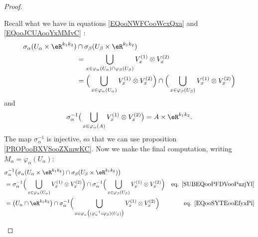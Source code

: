 \begin{proof}
\begin{subproof}
		Recall what we have in equations \eqref{EQooNWFCooWcxQxa} and \eqref{EQooJCUAooYxMMvC} :
		\begin{subequations}
			\begin{align}
				\sigma_{\alpha}(U_{\alpha}\times \eR^{k_1k_2}) & \cap \sigma_{\beta}(U_{\beta}\times \eR^{k_1k_2})                                                                                                                                                  \\
				                                               & =\bigcup_{x\in \varphi_{\alpha}(U_{\alpha})\cap \varphi_{\beta}(U_{\beta})}V_x^{(1)}\otimes V_x^{(2)}                                                                                              \\
				                                               & = \Big( \bigcup_{x\in \varphi_{\alpha}(U_{\alpha})}V_x^{(1)}\otimes V_x^{(2)} \Big)\cap\Big( \bigcup_{x\in \varphi_{\beta}(U_{\beta})}V_x^{(1)}\otimes V_x^{(2)}  \Big)		\label{SUBEQooPFDVooPuzjYl}
			\end{align}
		\end{subequations}
		and
		\begin{equation}		\label{EQooSYTEooEfyxPi}
			\sigma_{\alpha}^{-1}\big( \bigcup_{x\in \varphi_{\alpha}(A)}V_x^{(1)}\otimes V_x^{(2)} \big)    =A\times \eR^{k_1k_2}.
		\end{equation}
		The map \( \sigma_{\alpha}^{-1}\) is injective, so that we can use proposition \ref{PROPooBXVSooZXmwKC}. Now we make the final computation, writing \( M_{\alpha}=\varphi_{\alpha}(U_{\alpha})\):
		\begin{subequations}
			\begin{align}
				 & \sigma_{\alpha}^{-1}\big( \sigma_{\alpha}(U_{\alpha}\times \eR^{k_1k_2}) \cap \sigma_{\beta}(U_{\beta}\times \eR^{k_1k_2})  \big)                                                                                                                               \\
				 & = \sigma_{\alpha}^{-1}\Big(  \bigcup_{x\in \varphi_{\alpha}(U_{\alpha})}V_x^{(1)}\otimes V_x^{(2)}  \Big) \cap   \sigma_{\alpha}^{-1}\Big(  \bigcup_{x\in \varphi_{\beta}(U_{\beta})}V_x^{(1)}\otimes V_x^{(2)}  \Big) & \text{eq. \eqref{SUBEQooPFDVooPuzjYl}} \\
				 & = \big( U_{\alpha}\cap \eR^{k_1k_2} \big) \cap   \sigma_{\alpha}^{-1}\Big(  \bigcup_{x\in  \varphi_{\alpha}\big( (\varphi_{\alpha}^{-1}\circ\varphi_{\beta})(U_{\beta}) \big)   }V_x^{(1)}\otimes V_x^{(2)}  \Big)     & \text{eq. \eqref{EQooSYTEooEfyxPi}}    \\

\end{align}
\end{subequations}
\end{subproof}
\end{proof}
